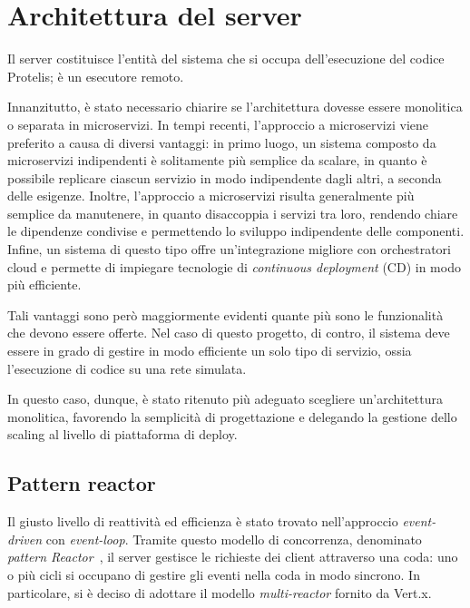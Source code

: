   \section{Architettura del server}\label{sec:arch:server}

    Il server costituisce l'entità del sistema che si occupa dell'esecuzione del codice Protelis; è un esecutore remoto.

    Innanzitutto, è stato necessario chiarire se l'architettura dovesse essere monolitica o separata in microservizi.
    In tempi recenti, l'approccio a microservizi viene preferito a causa di diversi vantaggi:
    in primo luogo, un sistema composto da microservizi indipendenti è solitamente più semplice da scalare,
    in quanto è possibile replicare ciascun servizio in modo indipendente dagli altri, a seconda delle esigenze.
    Inoltre, l'approccio a microservizi risulta generalmente più semplice da manutenere,
    in quanto disaccoppia i servizi tra loro, rendendo chiare le dipendenze condivise e permettendo lo sviluppo indipendente delle componenti.
    Infine, un sistema di questo tipo offre un'integrazione migliore con orchestratori cloud e permette di impiegare tecnologie di \emph{continuous deployment} (CD) in modo più efficiente.

    Tali vantaggi sono però maggiormente evidenti quante più sono le funzionalità che devono essere offerte.
    Nel caso di questo progetto, di contro, il sistema deve essere in grado di gestire in modo efficiente un solo tipo di servizio, ossia l'esecuzione di codice su una rete simulata.

    In questo caso, dunque, è stato ritenuto più adeguato scegliere un'architettura monolitica, favorendo la semplicità di progettazione
    e delegando la gestione dello scaling al livello di piattaforma di deploy.

    \subsection{Pattern reactor}\label{subsec:reactor}

      Il giusto livello di reattività ed efficienza è stato trovato nell'approccio \emph{event-driven} con \emph{event-loop}.
      Tramite questo modello di concorrenza, denominato \emph{pattern Reactor}~\cite{Schmidt1995ReactorAO}, il server gestisce le richieste dei client attraverso una coda:
      uno o più cicli si occupano di gestire gli eventi nella coda in modo sincrono.
      In particolare, si è deciso di adottare il modello \emph{multi-reactor} fornito da Vert.x.


